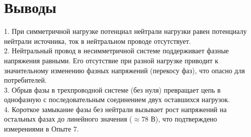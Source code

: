 \documentclass[a4paper,12pt]{article}
\begin{document}
\newpage

\section{Выводы}
1. При симметричной нагрузке потенциал нейтрали нагрузки равен потенциалу нейтрали источника, ток в нейтральном проводе отсутствует. \\
2. Нейтральный провод в несимметричной системе поддерживает фазные напряжения равными. Его отсутствие при разной нагрузке приводит к значительному изменению фазных напряжений (перекосу фаз), что опасно для потребителей. \\
3. Обрыв фазы в трехпроводной системе (без нуля) превращает цепь в однофазную с последовательным соединением двух оставшихся нагрузок. \\
4. Короткое замыкание фазы без нейтрали вызывает рост напряжений на остальных фазах до линейного значения ($\approx 78$ В), что подтверждено измерениями в Опыте 7. \\
\end{document}
